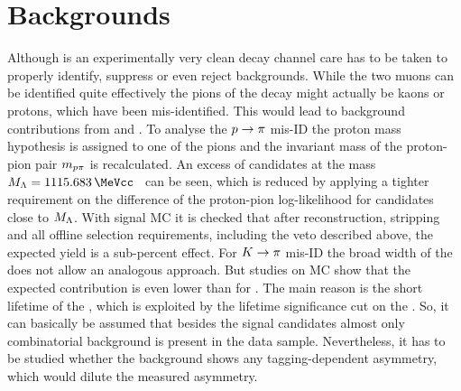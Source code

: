 
\section{Backgrounds}
\label{sec:bd2jpsiks:backgrounds}

Although \BdToJPsiKS is an experimentally very clean decay channel care has to
be taken to properly identify, suppress or even reject backgrounds. While the
two muons can be identified quite effectively the pions of the \KS decay might
actually be kaons or protons, which have been mis-identified. This would lead
to background contributions from \BdToJPsiKst and \LbToJPsiL. To analyse the
${p} \rightarrow {\ensuremath{\pi}}$ mis-ID the proton mass hypothesis is assigned to one of
the pions and the invariant mass of the proton-pion pair $m_{{p}{\pi}}$ is
recalculated. An excess of candidates at the \Lz mass $M_{\Lz} =
\SI{1115.683}{\MeVcc}$~\cite{PDG2014} can be seen, which is reduced by applying
a tighter requirement on the difference of the proton-pion log-likelihood for
candidates close to $M_{{\Lambda}}$. With \LbToJPsiL signal MC it is checked that
after reconstruction, stripping and all offline selection requirements,
including the veto described above, the expected yield is a sub-percent
effect. For ${K} \rightarrow {\ensuremath{\pi}}$ mis-ID the broad width of the \Kstarz does not
allow an analogous approach. But studies on \BdToJPsiKst MC show that the
expected contribution is even lower than for \LbToJPsiL. The main reason is
the short lifetime of the \Kstarz, which is exploited by the lifetime
significance cut on the \KS. So, it can basically be assumed that besides the
signal candidates almost only combinatorial background is present in the data
sample. Nevertheless, it has to be studied whether the background shows any
tagging-dependent asymmetry, which would dilute the measured \CP asymmetry.

